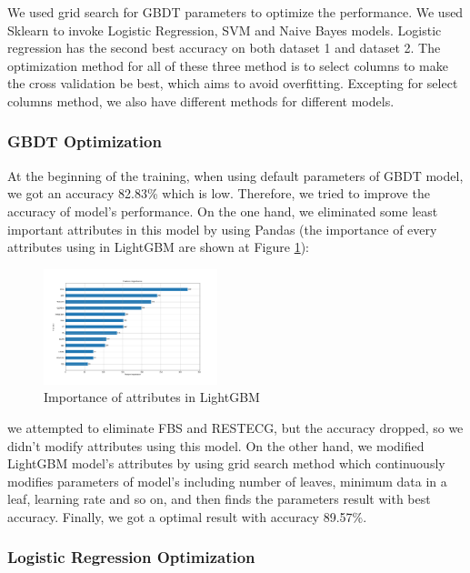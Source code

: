 \documentclass[letterpaper]{article} %
\begin{document}
We used grid search for GBDT parameters to optimize the performance. We used Sklearn to invoke Logistic Regression, SVM and Naive Bayes models. Logistic regression has the second best accuracy on both dataset 1 and dataset 2. The optimization method for all of these three method is to select columns to make the cross validation be best, which aims to avoid overfitting. Excepting for select columns method, we also have different methods for different models.

\subsubsection{GBDT Optimization}

At the beginning of the training, when using default parameters of GBDT model, we got an accuracy 82.83\% which is low. Therefore, we tried to improve the accuracy of model's performance. On the one hand, we eliminated some least important attributes in this model by using Pandas (the importance of every attributes using in LightGBM are shown at Figure \ref{fig:dataset-1-impor}):

\begin{figure}[!htbp]
\centering\includegraphics[width=0.45\textwidth]{dataset-1-impor}
\caption{Importance of attributes in LightGBM}
\label{fig:dataset-1-impor}
\end{figure}

we attempted to eliminate FBS and RESTECG, but the accuracy dropped, so we didn't modify attributes using this model. On the other hand, we modified LightGBM model's attributes by using grid search method which continuously modifies parameters of model's including number of leaves, minimum data in a leaf, learning rate and so on, and then finds the parameters result with best accuracy. Finally, we got a optimal result with accuracy 89.57\%.

\subsubsection{Logistic Regression Optimization}
\end{document}
